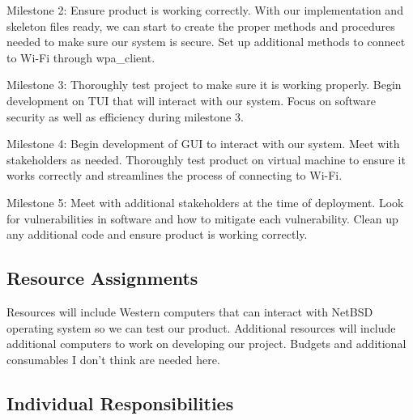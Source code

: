Milestone 2: Ensure product is working correctly. With our implementation and skeleton files ready, we can start to create the proper methods and procedures 
needed to make sure our system is secure. Set up additional methods to connect to Wi-Fi through wpa\_client. 

Milestone 3: Thoroughly test project to make sure it is working properly. Begin development on TUI that will interact with our system. Focus on software security 
as well as efficiency during milestone 3. 

Milestone 4: Begin development of GUI to interact with our system. Meet with stakeholders as needed. Thoroughly test product on virtual machine to ensure it works 
correctly and streamlines the process of connecting to Wi-Fi. 

Milestone 5: Meet with additional stakeholders at the time of deployment. Look for vulnerabilities in software and how to mitigate each vulnerability. Clean up any 
additional code and ensure product is working correctly. 


\subsection{Resource Assignments}
%

Resources will include Western computers that can interact with NetBSD operating system so we can test our product. Additional resources will include 
additional computers to work on developing our project. Budgets and additional consumables I don’t think are needed here. 


\subsection{Individual Responsibilities}
%



